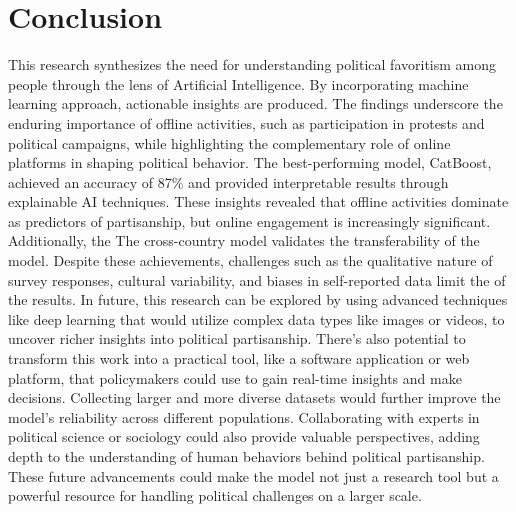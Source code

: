 \documentclass[pt]{article}  %
\begin{document}
\section{Conclusion}

This research synthesizes the need for understanding political favoritism among people through the lens of Artificial Intelligence. By incorporating machine learning approach, actionable insights are produced. The findings underscore the enduring importance of offline activities, such as participation in protests and political campaigns, while highlighting the complementary role of online platforms in shaping political behavior. The best-performing model, CatBoost, achieved an accuracy of 87\% and provided interpretable results through explainable AI techniques. These insights revealed that offline activities dominate as predictors of partisanship, but online engagement is increasingly significant. Additionally, the The cross-country model validates the transferability of the model. Despite these achievements, challenges such as the qualitative nature of survey responses, cultural variability, and biases in self-reported data limit the of the results. In future, this research can be explored by using advanced techniques like deep learning that would utilize complex data types like images or videos, to uncover richer insights into political partisanship. There’s also potential to transform this work into a practical tool, like a software application or web platform, that policymakers could use to gain real-time insights and make decisions. Collecting larger and more diverse datasets would further improve the model’s reliability across different populations. Collaborating with experts in political science or sociology could also provide valuable perspectives, adding depth to the understanding of human behaviors behind political partisanship. These future advancements could make the model not just a research tool but a powerful resource for handling political challenges on a larger scale.
 
\end{document}
